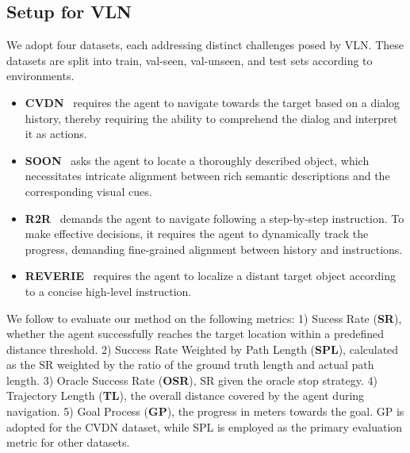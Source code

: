 \subsection{Setup for VLN} 
\label{sec:exp_vln}

 We adopt four datasets, each addressing distinct challenges posed by VLN. These datasets are split into train, val-seen, val-unseen, and test sets according to environments.

\begin{itemize}[leftmargin=*]
\setlength{\itemsep}{0pt}
\setlength{\parsep}{0pt}
\setlength{\parskip}{0pt}
\item{\textbf{CVDN}~\cite{thomason2020vision}} requires the agent to navigate towards the target based on a dialog history, thereby requiring the ability to comprehend the dialog and interpret it as actions.

\item{\textbf{SOON}~\cite{zhu2021soon}} asks the agent to locate a thoroughly described object, which necessitates intricate alignment between rich semantic descriptions and the corresponding visual cues.

\item{\textbf{R2R}~\cite{anderson2018vision}} demands the agent to navigate following a step-by-step instruction.
To make effective decisions, it requires the agent to dynamically track the progress, demanding fine-grained alignment between history and instructions.

\item{\textbf{REVERIE}~\cite{qi2020reverie}} requires the agent to localize a distant target object according to a concise high-level instruction.

\end{itemize}

We follow \cite{anderson2018vision} to evaluate our method on the following metrics: 
1) Sucess Rate (\textbf{SR}), whether the agent successfully reaches the target location within a predefined distance threshold. 
2) Success Rate Weighted by Path Length (\textbf{SPL}), calculated as the SR weighted by the ratio of the ground truth length and actual path length. 
3) Oracle Success Rate (\textbf{OSR}), SR given the oracle stop strategy.
4) Trajectory Length (\textbf{TL}), the overall distance covered by the agent during navigation. 
5) Goal Process (\textbf{GP}), the progress in meters towards the goal.
GP is adopted for the CVDN dataset, while SPL is employed as the primary evaluation metric for other datasets.

